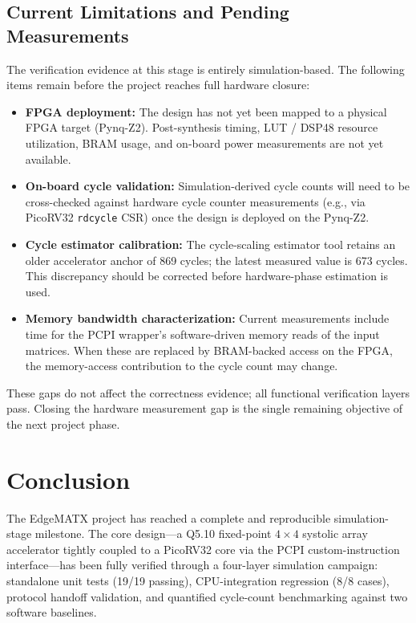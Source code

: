 ﻿\documentclass[12pt,a4paper]{report}
\begin{document}
\section{Current Limitations and Pending Measurements}

The verification evidence at this stage is entirely simulation-based.
The following items remain before the project reaches full hardware closure:

\begin{itemize}
    \item \textbf{FPGA deployment:} The design has not yet been mapped to a physical FPGA target (Pynq-Z2).
          Post-synthesis timing, LUT / DSP48 resource utilization, BRAM usage, and on-board power measurements are not yet available.

    \item \textbf{On-board cycle validation:} Simulation-derived cycle counts will need to be cross-checked against hardware cycle counter measurements (e.g., via PicoRV32 \texttt{rdcycle} CSR) once the design is deployed on the Pynq-Z2.

    \item \textbf{Cycle estimator calibration:} The cycle-scaling estimator tool retains an older accelerator anchor of 869 cycles; the latest measured value is 673 cycles.
          This discrepancy should be corrected before hardware-phase estimation is used.

    \item \textbf{Memory bandwidth characterization:} Current measurements include time for the PCPI wrapper's software-driven memory reads of the input matrices.
          When these are replaced by BRAM-backed access on the FPGA, the memory-access contribution to the cycle count may change.
\end{itemize}

These gaps do not affect the correctness evidence; all functional verification layers pass.
Closing the hardware measurement gap is the single remaining objective of the next project phase.


\chapter{Conclusion}

The EdgeMATX project has reached a complete and reproducible simulation-stage milestone.
The core design---a Q5.10 fixed-point $4 \times 4$ systolic array accelerator tightly coupled to a PicoRV32 core via the PCPI custom-instruction interface---has been fully verified through a four-layer simulation campaign: standalone unit tests (19/19 passing), CPU-integration regression (8/8 cases), protocol handoff validation, and quantified cycle-count benchmarking against two software baselines.
\end{document}
